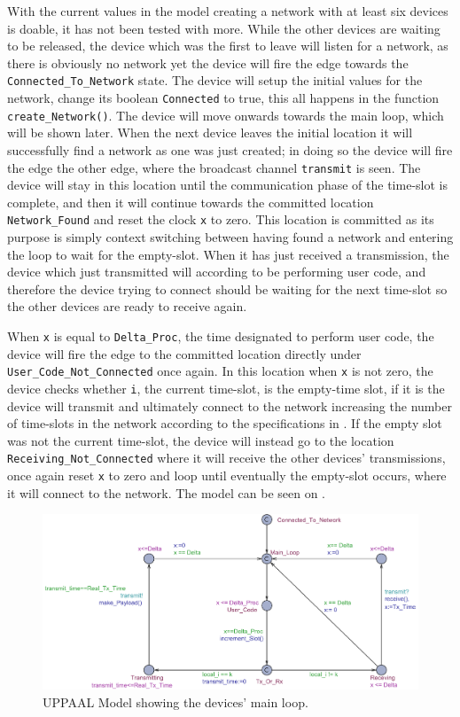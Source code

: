 With the current values in the model creating a network with at least six devices is doable, it has not been tested with more.
While the other devices are waiting to be released, the device which was the first to leave will listen for a network, as there is obviously no network yet the device will fire the edge towards the \texttt{Connected\_To\_Network} state.
The device will setup the initial values for the network, change its boolean \texttt{Connected} to true, this all happens in the function \texttt{create\_Network()}. The device will move onwards towards the main loop, which will be shown later.
When the next device leaves the initial location it will successfully find a network as one was just created; in doing so the device will fire the edge the other edge, where the broadcast channel \texttt{transmit} is seen.
The device will stay in this location until the communication phase of the time-slot is complete, and then it will continue towards the committed location \texttt{Network\_Found} and reset the clock \texttt{x} to zero.
This location is committed as its purpose is simply context switching between having found a network and entering the loop to wait for the empty-slot.
When it has just received a transmission, the device which just transmitted will according to  be performing user code, and therefore the device trying to connect should be waiting for the next time-slot so the other devices are ready to receive again.

\bigskip \noindent
When \texttt{x} is equal to \texttt{Delta\_Proc}, the time designated to perform user code, the device will fire the edge to the committed location directly under \texttt{User\_Code\_Not\_Connected} once again.
In this location when \texttt{x} is not zero, the device checks whether \texttt{i}, the current time-slot, is the empty-time slot, if it is the device will transmit and ultimately connect to the network increasing the number of time-slots in the network according to the specifications in .
If the empty slot was not the current time-slot, the device will instead go to the location \texttt{Receiving\_Not\_Connected} where it will receive the other devices' transmissions, once again reset \texttt{x} to zero and loop until eventually the empty-slot occurs, where it will connect to the network.
The model can be seen on .

\begin{figure}
  \includegraphics[width=1\textwidth]{Figures/Model/Device_Connected.pdf} 
\caption{UPPAAL Model showing the devices' main loop.}
\label{fig:UPPAAL_Connected}
\end{figure}

